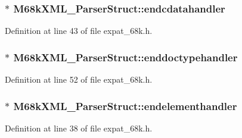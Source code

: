 \subsubsection[{\texorpdfstring{endcdatahandler}{endcdatahandler}}]{$\ast$ M68k\+X\+M\+L\+\_\+\+Parser\+Struct\+::endcdatahandler}\hypertarget{struct_m68k_x_m_l___parser_struct_adb25feaaf58fdfd5a96787479047eea5}{}\label{struct_m68k_x_m_l___parser_struct_adb25feaaf58fdfd5a96787479047eea5}


Definition at line 43 of file expat\+\_\+68k.\+h.

\subsubsection[{\texorpdfstring{enddoctypehandler}{enddoctypehandler}}]{$\ast$ M68k\+X\+M\+L\+\_\+\+Parser\+Struct\+::enddoctypehandler}\hypertarget{struct_m68k_x_m_l___parser_struct_a3eb006298d6542f49b5573cf4cc21840}{}\label{struct_m68k_x_m_l___parser_struct_a3eb006298d6542f49b5573cf4cc21840}


Definition at line 52 of file expat\+\_\+68k.\+h.

\subsubsection[{\texorpdfstring{endelementhandler}{endelementhandler}}]{$\ast$ M68k\+X\+M\+L\+\_\+\+Parser\+Struct\+::endelementhandler}\hypertarget{struct_m68k_x_m_l___parser_struct_a00fe1971c9a92b7cfddd4d54bbdf2e8d}{}\label{struct_m68k_x_m_l___parser_struct_a00fe1971c9a92b7cfddd4d54bbdf2e8d}


Definition at line 38 of file expat\+\_\+68k.\+h.

